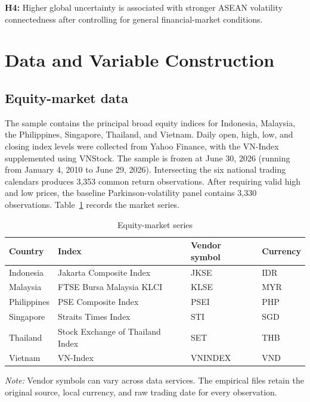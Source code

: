 \documentclass[12pt,a4paper]{article}
\begin{document}
\textbf{H4:} Higher global uncertainty is associated with stronger ASEAN volatility connectedness after controlling for general financial-market conditions.

\section{Data and Variable Construction}
\label{sec:data}

\subsection{Equity-market data}

The sample contains the principal broad equity indices for Indonesia, Malaysia, the Philippines, Singapore, Thailand, and Vietnam. Daily open, high, low, and closing index levels were collected from Yahoo Finance, with the VN-Index supplemented using VNStock. The sample is frozen at June 30, 2026 (running from January 4, 2010 to June 29, 2026). Intersecting the six national trading calendars produces 3,353 common return observations. After requiring valid high and low prices, the baseline Parkinson-volatility panel contains 3,330 observations. Table~\ref{tab:markets} records the market series.

\begin{table}[H]
\centering
\caption{Equity-market series}
\label{tab:markets}
\begin{tabular}{llll}
\toprule
Country & Index & Vendor symbol & Currency \\
\midrule
Indonesia & Jakarta Composite Index & JKSE & IDR \\
Malaysia & FTSE Bursa Malaysia KLCI & KLSE & MYR \\
Philippines & PSE Composite Index & PSEI & PHP \\
Singapore & Straits Times Index & STI & SGD \\
Thailand & Stock Exchange of Thailand Index & SET & THB \\
Vietnam & VN-Index & VNINDEX & VND \\
\bottomrule
\end{tabular}
\begin{minipage}{0.92\textwidth}
\footnotesize\textit{Note:} Vendor symbols can vary across data services. The empirical files retain the original source, local currency, and raw trading date for every observation.
\end{minipage}
\end{table}
\end{document}
